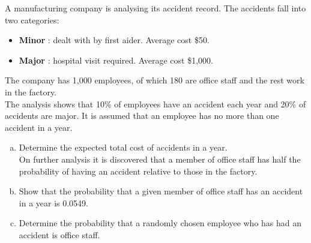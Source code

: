 \documentclass[a4paper,12pt]{article}
\begin{document}
\large
\noindent A manufacturing company is analysing its accident record. The accidents fall into two categories:


\begin{itemize}
    \item \textbf{Minor} : dealt with by first aider. Average cost \$50.
    \item \textbf{Major} : hospital visit required. Average cost \$1,000.
\end{itemize}  
The company has 1,000 employees, of which 180 are office staff and the rest work in the factory.\\

\noindent The analysis shows that 10\% of employees have an accident each year and 20\% of  accidents are major. It is assumed that an employee has no more than one accident in
a year.
\begin{enumerate}[(a)]
\item  Determine the expected total cost of accidents in a year. \\
\medskip 
On further analysis it is discovered that a member of office staff has half the probability of having an accident relative to those in the factory.
\item  Show that the probability that a given member of office staff has an accident in a year is 0.0549. 
\item  Determine the probability that a randomly chosen employee who has had an accident is office staff. 
\end{enumerate}

\newpage
\end{document}
